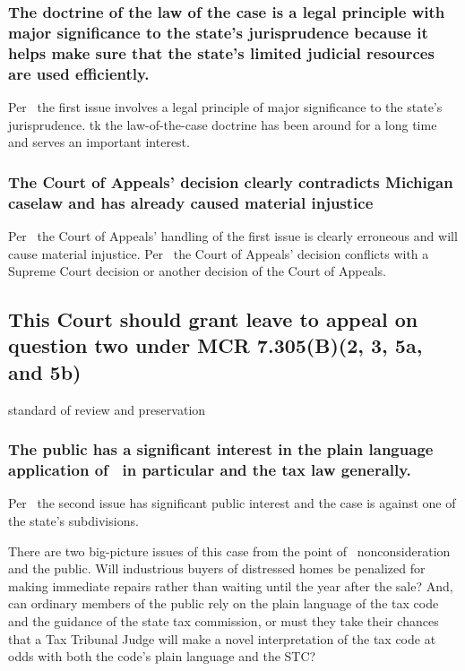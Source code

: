\documentclass[12pt,\documentclassflag]{michiganCourtOfAppealsBrief}
\begin{document}
\subsubsection{The doctrine of the law of the case is a legal principle with major significance to the state's jurisprudence because it helps make sure that the state's limited judicial resources are used efficiently.}

Per \cite{MCR 7.305(B)(3)}\ the first issue involves a legal principle of major significance to the state's jurisprudence. tk the law-of-the-case doctrine has been around for a long time and serves an important interest.

\subsubsection{The Court of Appeals' decision clearly contradicts Michigan caselaw and has already caused material injustice}

Per \cite{MCR 7.305(B)(5a)}\ the Court of Appeals' handling of the first issue is clearly erroneous and will cause material injustice.
Per \cite{MCR 7.305(B)(5b)}\ the Court of Appeals' decision conflicts with a Supreme Court decision or another decision of the Court of Appeals. 

\subsection{This Court should grant leave to appeal on question two under MCR 7.305(B)(2, 3, 5a, and 5b)}

standard of review and preservation

\subsubsection{The public has a significant interest in the plain language application of \mathieuGast\ in particular and the tax law generally.}

Per \cite{MCR 7.305(B)(2)}\ the second issue has significant public interest and the case is against one of the state's subdivisions.

There are two big-picture issues of this case from the point of \mathieuGast\ nonconsideration and the public. Will industrious buyers of distressed homes be penalized for making immediate repairs rather than waiting until the year after the sale? And, can ordinary members of the public rely on the plain language of the tax code and the guidance of the state tax commission, or must they take their chances that a Tax Tribunal Judge will make a novel interpretation of the tax code at odds with both the code's plain language and the STC?
\end{document}
